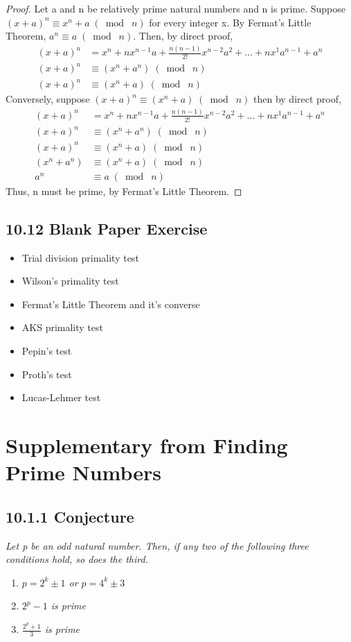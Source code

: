 \documentclass{article}
\begin{document}
\begin{proof}
Let a and n be relatively prime natural numbers and n is prime. Suppose $(x+a)^n \equiv x^n+a \;(\bmod\; n)$ for every integer x. By Fermat's Little Theorem, $a^n \equiv a \;(\bmod\; n)$. Then, by direct proof,
\begin{align*}
    &&(x+a)^n &= x^n + nx^{n-1}a + \frac{n(n-1)}{2!}x^{n-2}a^2 + ... + nx^1a^{n-1} + a^n&&\\
    &&(x+a)^n &\equiv (x^n+a^n) \;(\bmod\; n)&&\\
    &&(x+a)^n &\equiv (x^n+a) \;(\bmod\; n)&&
\end{align*}
Conversely, suppose $(x+a)^n \equiv (x^n+a) \;(\bmod\; n)$ then by direct proof,
\begin{align*}
    &&(x+a)^n &= x^n + nx^{n-1}a + \frac{n(n-1)}{2!}x^{n-2}a^2 + ... + nx^1a^{n-1} + a^n&&\\
    &&(x+a)^n &\equiv (x^n+a^n) \;(\bmod\; n)&&\\
    &&(x+a)^n &\equiv (x^n+a) \;(\bmod\; n)&&\\
    &&(x^n+a^n) &\equiv (x^n+a) \;(\bmod\; n)&&\\
    &&a^n &\equiv a \;(\bmod\; n)&&
\end{align*}
Thus, n must be prime, by Fermat's Little Theorem.
\end{proof}

\subsection*{10.12 Blank Paper Exercise} 
\begin{itemize}
    \item Trial division primality test
    \item Wilson's primality test
    \item Fermat's Little Theorem and it's converse
    \item AKS primality test
    \item Pepin's test
    \item Proth's test
    \item Lucas-Lehmer test
\end{itemize}

\section*{Supplementary from Finding Prime Numbers}

\subsection*{10.1.1 Conjecture} 
\quad \textit{Let p be an odd natural number. Then, if any two of the following three conditions hold, so does the third.}
\begin{enumerate}[label=a.]
    \item \textit{$p = 2^k \pm 1$ or $p = 4^k \pm 3$}
    \item \textit{$2^p - 1$ is prime}
    \item \textit{$\frac{2^p+1}{3}$ is prime}
\end{enumerate}
\end{document}

